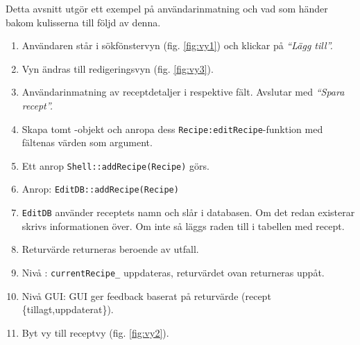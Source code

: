 Detta avsnitt utgör ett exempel på användarinmatning och vad som händer bakom kulisserna till följd av denna.

\begin{enumerate}
  \item Användaren står i sökfönstervyn (fig. \ref{fig:vy1}) och klickar på \emph{``Lägg till''.}
  \item Vyn ändras till redigeringsvyn (fig. \ref{fig:vy3}). 
  \item Användarinmatning av receptdetaljer i respektive fält. Avslutar med \emph{``Spara recept''.}
  \item Skapa tomt \Recipe-objekt och anropa dess \verb=Recipe:editRecipe=-funktion med fältenas värden som argument.
  \item Ett anrop \verb=Shell::addRecipe(Recipe)= görs.
  \item Anrop: \verb=EditDB::addRecipe(Recipe)=
  \item \verb=EditDB= använder receptets namn och slår i databasen. Om det redan existerar skrivs informationen över. Om inte så läggs raden till i tabellen med recept.
  \item Returvärde returneras beroende av utfall.
  \item Nivå \Shell: \verb=currentRecipe_= uppdateras, returvärdet ovan returneras uppåt.
  \item Nivå GUI: GUI ger feedback baserat på returvärde (recept \{tillagt,uppdaterat\}).
\item Byt vy till receptvy (fig. \ref{fig:vy2}).
\end{enumerate}

